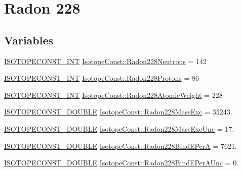 \hypertarget{group___isotope_const-_radon-_rn228}{}\section{Radon 228}
\label{group___isotope_const-_radon-_rn228}
\subsection*{Variables}
\begin{DoxyCompactItemize}
\item 
\mbox{\hyperlink{group___isotope_const-_macros_ga5f18360b3e99483a35c32d789e62621c}{I\+S\+O\+T\+O\+P\+E\+C\+O\+N\+S\+T\+\_\+\+I\+NT}} \mbox{\hyperlink{group___isotope_const-_radon-_rn228_ga2ba11ba3cfeb2688146f93746c58528b}{Isotope\+Const\+::\+Radon228\+Neutrons}} = 142
\item 
\mbox{\hyperlink{group___isotope_const-_macros_ga5f18360b3e99483a35c32d789e62621c}{I\+S\+O\+T\+O\+P\+E\+C\+O\+N\+S\+T\+\_\+\+I\+NT}} \mbox{\hyperlink{group___isotope_const-_radon-_rn228_ga1f86d1cdf1e4bf0e2f2bb1f06db33ea8}{Isotope\+Const\+::\+Radon228\+Protons}} = 86
\item 
\mbox{\hyperlink{group___isotope_const-_macros_ga5f18360b3e99483a35c32d789e62621c}{I\+S\+O\+T\+O\+P\+E\+C\+O\+N\+S\+T\+\_\+\+I\+NT}} \mbox{\hyperlink{group___isotope_const-_radon-_rn228_ga4478881327019aea184821d22f98e43a}{Isotope\+Const\+::\+Radon228\+Atomic\+Weight}} = 228
\item 
\mbox{\hyperlink{group___isotope_const-_macros_ga8f45a7272ce02c0b4c65c44636ed719a}{I\+S\+O\+T\+O\+P\+E\+C\+O\+N\+S\+T\+\_\+\+D\+O\+U\+B\+LE}} \mbox{\hyperlink{group___isotope_const-_radon-_rn228_ga18095b61cd6d11888b7e67e0f6e6f9d3}{Isotope\+Const\+::\+Radon228\+Mass\+Exc}} = 35243.
\item 
\mbox{\hyperlink{group___isotope_const-_macros_ga8f45a7272ce02c0b4c65c44636ed719a}{I\+S\+O\+T\+O\+P\+E\+C\+O\+N\+S\+T\+\_\+\+D\+O\+U\+B\+LE}} \mbox{\hyperlink{group___isotope_const-_radon-_rn228_ga1ebdd2a26afb63911e951e5caf9f6dc3}{Isotope\+Const\+::\+Radon228\+Mass\+Exc\+Unc}} = 17.
\item 
\mbox{\hyperlink{group___isotope_const-_macros_ga8f45a7272ce02c0b4c65c44636ed719a}{I\+S\+O\+T\+O\+P\+E\+C\+O\+N\+S\+T\+\_\+\+D\+O\+U\+B\+LE}} \mbox{\hyperlink{group___isotope_const-_radon-_rn228_gac271faa8e78ed71718ecd85b44549b1a}{Isotope\+Const\+::\+Radon228\+Bind\+E\+PerA}} = 7621.
\item 
\mbox{\hyperlink{group___isotope_const-_macros_ga8f45a7272ce02c0b4c65c44636ed719a}{I\+S\+O\+T\+O\+P\+E\+C\+O\+N\+S\+T\+\_\+\+D\+O\+U\+B\+LE}} \mbox{\hyperlink{group___isotope_const-_radon-_rn228_gaffaa059684606b7cb1d4bfb78bbe79ed}{Isotope\+Const\+::\+Radon228\+Bind\+E\+Per\+A\+Unc}} = 0.

\end{DoxyCompactItemize}
